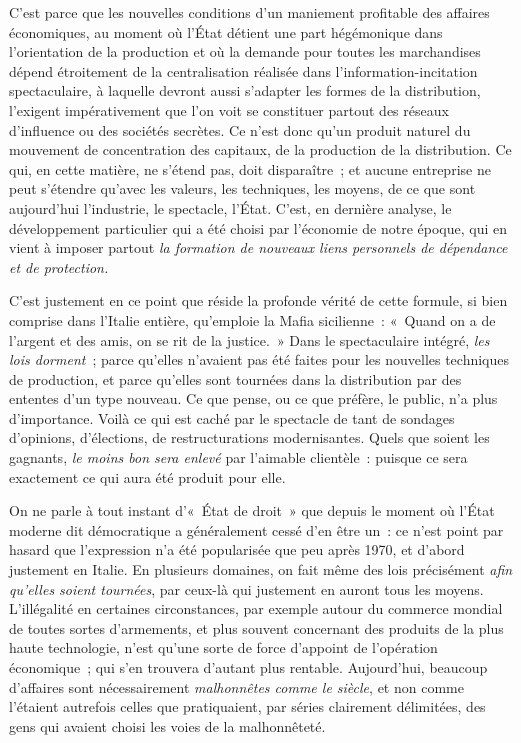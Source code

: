 \documentclass[french,twoside]{book} %
\def\mednobreak{\ifdim\lastskip<\medskipamount
  \removelastskip\nopagebreak\medskip\fi}
\newcommand{\labelblock}[1]{\medbreak{\noindent\color{rubric}\bfseries #1}\par\mednobreak}
\begin{document}
\labelblock{XXVI}

\noindent C’est parce que les nouvelles conditions d’un maniement profitable des affaires économiques, au moment où l’État détient une part hégémonique dans l’orientation de la production et où la demande pour toutes les marchandises dépend étroitement de la centralisation réalisée dans l’information-incitation spectaculaire, à laquelle devront aussi s’adapter les formes de la distribution, l’exigent impérativement que l’on voit se constituer partout des réseaux d’influence ou des sociétés secrètes. Ce n’est donc qu’un produit naturel du mouvement de concentration des capitaux, de la production de la distribution. Ce qui, en cette matière, ne s’étend pas, doit disparaître ; et aucune entreprise ne peut s’étendre qu’avec les valeurs, les techniques, les moyens, de ce que sont aujourd’hui l’industrie, le spectacle, l’État. C’est, en dernière analyse, le développement particulier qui a été choisi par l’économie de notre époque, qui en vient à imposer partout \emph{la formation de nouveaux liens personnels de dépendance et de protection.}\par
C’est justement en ce point que réside la profonde vérité de cette formule, si bien comprise dans l’Italie entière, qu’emploie la Mafia sicilienne : « Quand on a de l’argent et des amis, on se rit de la justice. » Dans le spectaculaire intégré, \emph{les lois dorment} ; parce qu’elles n’avaient pas été faites pour les nouvelles techniques de production, et parce qu’elles sont tournées dans la distribution par des ententes d’un type nouveau. Ce que pense, ou ce que préfère, le public, n’a plus d’importance. Voilà ce qui est caché par le spectacle de tant de sondages d’opinions, d’élections, de restructurations modernisantes. Quels que soient les gagnants, \emph{le moins bon sera enlevé} par l’aimable clientèle : puisque ce sera exactement ce qui aura été produit pour elle.\par
On ne parle à tout instant d’« État de droit » que depuis le moment où l’État moderne dit démocratique a généralement cessé d’en être un : ce n’est point par hasard que l’expression n’a été popularisée que peu après 1970, et d’abord justement en Italie. En plusieurs domaines, on fait même des lois précisément \emph{afin qu’elles soient tournées}, par ceux-là qui justement en auront tous les moyens. L’illégalité en certaines circonstances, par exemple autour du commerce mondial de toutes sortes d’armements, et plus souvent concernant des produits de la plus haute technologie, n’est qu’une sorte de force d’appoint de l’opération économique ; qui s’en trouvera d’autant plus rentable. Aujourd’hui, beaucoup d’affaires sont nécessairement \emph{malhonnêtes comme le siècle}, et non comme l’étaient autrefois celles que pratiquaient, par séries clairement délimitées, des gens qui avaient choisi les voies de la malhonnêteté.\par
\end{document}
